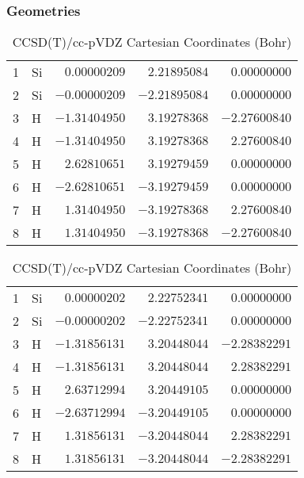 \documentclass[10pt,oneside]{article}
\begin{document}
\begin{table}[h!]
\subsubsection*{Geometries}
\begin{multicols}{2}
\centering
\caption{CCSD(T)/cc-pVTZ Cartesian Coordinates (Bohr)}
\begin{tabular}{llrrr}
\toprule
1  & Si & $ 0.00000209$ & $ 2.21895084$ & $ 0.00000000$ \\
2  & Si & $-0.00000209$ & $-2.21895084$ & $ 0.00000000$ \\
3  & H  & $-1.31404950$ & $ 3.19278368$ & $-2.27600840$ \\
4  & H  & $-1.31404950$ & $ 3.19278368$ & $ 2.27600840$ \\
5  & H  & $ 2.62810651$ & $ 3.19279459$ & $ 0.00000000$ \\
6  & H  & $-2.62810651$ & $-3.19279459$ & $ 0.00000000$ \\
7  & H  & $ 1.31404950$ & $-3.19278368$ & $ 2.27600840$ \\
8  & H  & $ 1.31404950$ & $-3.19278368$ & $-2.27600840$ \\
\bottomrule
\end{tabular}
\caption{CCSD(T)/cc-pVDZ Cartesian Coordinates (Bohr)}
\begin{tabular}{llrrr}
\toprule
1  & Si & $ 0.00000202$ & $ 2.22752341$ & $ 0.00000000$ \\
2  & Si & $-0.00000202$ & $-2.22752341$ & $ 0.00000000$ \\
3  & H  & $-1.31856131$ & $ 3.20448044$ & $-2.28382291$ \\
4  & H  & $-1.31856131$ & $ 3.20448044$ & $ 2.28382291$ \\
5  & H  & $ 2.63712994$ & $ 3.20449105$ & $ 0.00000000$ \\
6  & H  & $-2.63712994$ & $-3.20449105$ & $ 0.00000000$ \\
7  & H  & $ 1.31856131$ & $-3.20448044$ & $ 2.28382291$ \\
8  & H  & $ 1.31856131$ & $-3.20448044$ & $-2.28382291$ \\
\bottomrule
\end{tabular}
\end{multicols}
\end{table}
\end{document}

